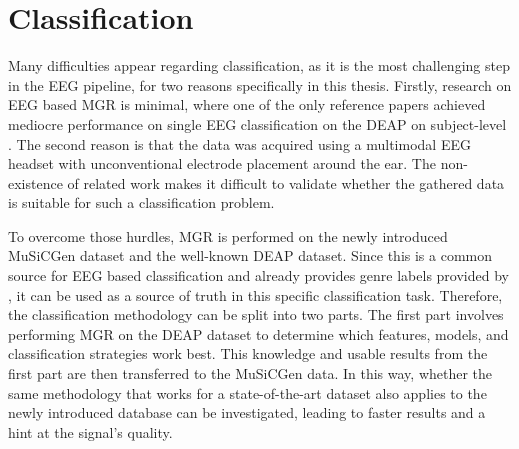   \section{Classification}
    Many difficulties appear regarding classification, as it is the most challenging step in the \ac{EEG} pipeline, for two reasons specifically in this thesis. Firstly, research on \ac{EEG} based \ac{MGR} is minimal, where one of the only reference papers achieved mediocre performance on single \ac{EEG} classification on the \ac{DEAP} on subject-level \cite{ghaemmaghami2016brain}. The second reason is that the data was acquired using a multimodal \ac{EEG} headset with unconventional electrode placement around the ear. The non-existence of related work makes it difficult to validate whether the gathered data is suitable for such a classification problem. \par
    To overcome those hurdles, \ac{MGR} is performed on the newly introduced \ac{MuSiCGen} dataset and the well-known \ac{DEAP} dataset. Since this is a common source for \ac{EEG} based classification and already provides genre labels provided by \cite{ghaemmaghami2016brain}, it can be used as a source of truth in this specific classification task. Therefore, the classification methodology can be split into two parts. The first part involves performing \ac{MGR} on the \ac{DEAP} dataset to determine which features, models, and classification strategies work best. This knowledge and usable results from the first part are then transferred to the \ac{MuSiCGen} data. In this way, whether the same methodology that works for a state-of-the-art dataset also applies to the newly introduced database can be investigated, leading to faster results and a hint at the signal's quality. \par

